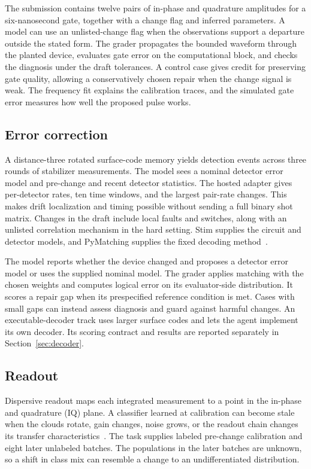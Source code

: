 \documentclass{article}
\begin{document}
The submission contains twelve pairs of in-phase and quadrature amplitudes for a six-nanosecond gate, together with a change flag and inferred parameters. A model can use an unlisted-change flag when the observations support a departure outside the stated form. The grader propagates the bounded waveform through the planted device, evaluates gate error on the computational block, and checks the diagnosis under the draft tolerances. A control case gives credit for preserving gate quality, allowing a conservatively chosen repair when the change signal is weak. The frequency fit explains the calibration traces, and the simulated gate error measures how well the proposed pulse works.

\subsection{Error correction}
A distance-three rotated surface-code memory yields detection events across three rounds of stabilizer measurements. The model sees a nominal detector error model and pre-change and recent detector statistics. The hosted adapter gives per-detector rates, ten time windows, and the largest pair-rate changes. This makes drift localization and timing possible without sending a full binary shot matrix. Changes in the draft include local faults and switches, along with an unlisted correlation mechanism in the hard setting. Stim supplies the circuit and detector models, and PyMatching supplies the fixed decoding method~\citep{stim,sparse,draftbench}.

The model reports whether the device changed and proposes a detector error model or uses the supplied nominal model. The grader applies matching with the chosen weights and computes logical error on its evaluator-side distribution. It scores a repair gap when its prespecified reference condition is met. Cases with small gaps can instead assess diagnosis and guard against harmful changes. An executable-decoder track uses larger surface codes and lets the agent implement its own decoder. Its scoring contract and results are reported separately in Section~\ref{sec:decoder}.

\subsection{Readout}
Dispersive readout maps each integrated measurement to a point in the in-phase and quadrature (IQ) plane. A classifier learned at calibration can become stale when the clouds rotate, gain changes, noise grows, or the readout chain changes its transfer characteristics~\citep{blais,draftbench}. The task supplies labeled pre-change calibration and eight later unlabeled batches. The populations in the later batches are unknown, so a shift in class mix can resemble a change to an undifferentiated distribution.
\end{document}
